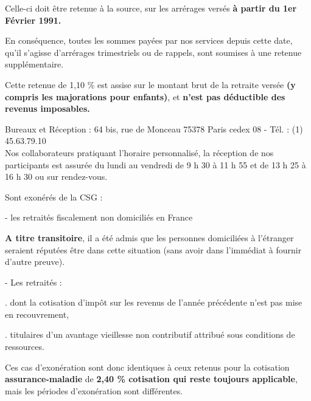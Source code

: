 Celle-ci doit être retenue à la source, sur les arrérages versés \textbf{à partir du 1er Février 1991.}

En conséquence, toutes les sommes payées par nos services depuis cette date, qu'il s'agisse d'arrérages trimestriels ou de rappels, sont soumises à une retenue supplémentaire.

Cette retenue de 1,10 \% est assise sur le montant brut de la retraite versée \textbf{(y compris les majorations pour enfants)}, et \textbf{n'est pas déductible des revenus imposables.}

Bureaux et Réception : 64 bis, rue de Monceau 75378 Paris cedex 08 - Tél. : (1) 45.63.79.10\\
Nos collaborateurs pratiquant l'horaire personnalisé, la réception de nos participants est assurée du lundi au vendredi de 9 h 30 à 11 h 55 et de 13 h 25 à 16 h 30 ou sur rendez-vous.

Sont exonérés de la CSG :

- les retraités fiscalement non domiciliés en France

\textbf{A titre transitoire}, il a été admis que les personnes domiciliées à l'étranger seraient réputées être dans cette situation (sans avoir dans l'immédiat à fournir d'autre preuve).

- Les retraités :

. dont la cotisation d'impôt sur les revenus de l'année précédente n'est pas mise en recouvrement,

. titulaires d'un avantage vieillesse non contributif attribué sous conditions de ressources.

Ces cas d'exonération sont donc identiques à ceux retenus pour la cotisation \textquotedbl{}\textbf{assurance-maladie}\textquotedbl{} de \textbf{2,40 \% cotisation qui reste toujours applicable}, mais les périodes d'exonération sont différentes.

